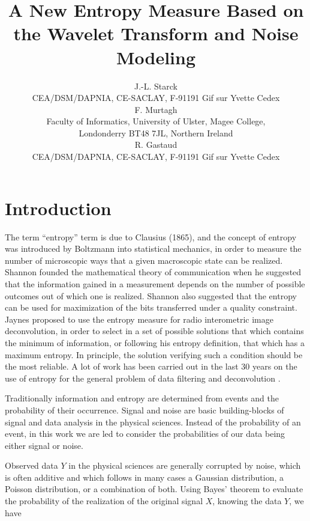 \documentclass[11pt,a4paper]{article}
\title{A New Entropy Measure Based on the Wavelet Transform and Noise Modeling}
\author{ J.-L. Starck \\
CEA/DSM/DAPNIA, CE-SACLAY, F-91191 Gif sur Yvette Cedex \\ [12pt]
F. Murtagh \\
Faculty of Informatics, University of Ulster, Magee College, \\
Londonderry BT48 7JL, Northern Ireland \\ [12pt]
R. Gastaud \\
CEA/DSM/DAPNIA, CE-SACLAY, F-91191 Gif sur Yvette Cedex}
\begin{document}
\maketitle

  
\section{Introduction}
The term ``entropy'' term is due to Clausius (1865), and the concept of 
entropy was introduced by Boltzmann into statistical mechanics,
in order to measure the number of microscopic ways that a given macroscopic
state can be realized. Shannon \cite{shannon48} 
founded the mathematical theory of
communication when he suggested that the information gained in a 
measurement depends on the number of possible outcomes out of 
which one is realized. Shannon also suggested that 
the entropy can be used for maximization of the bits transferred under
a quality constraint. Jaynes \cite{jaynes57} proposed to use 
the entropy measure
for radio interometric image deconvolution,  in
order to select in a set of possible solutions that which contains the
minimum of information, or following his entropy definition, that 
which has a maximum entropy. In principle, the solution verifying such 
a condition should be the most reliable. A lot of work has been carried out
in the last 30 years on the use of entropy for the general problem
of data filtering and deconvolution 
\cite{ables74,bontekoe94,burg67,frieden75,gull91,narrayan86,pantin96,skilling84_1,
weir92}. 

Traditionally information and entropy are determined from events and the
probability of their occurrence.  Signal and noise are basic building-blocks 
of signal and data analysis in the physical sciences.  Instead of the 
probability of an event, in this work
 we are led to consider the probabilities of our
data being either signal or noise. 

Observed data $Y$ in the physical sciences 
are generally corrupted by noise, which is often additive and which 
follows in many cases a Gaussian distribution, a Poisson distribution, or
a combination of both.
 Using Bayes' theorem to evaluate the probability of the 
realization of the original signal $X$,
knowing the data $Y$, we have
\end{document}
